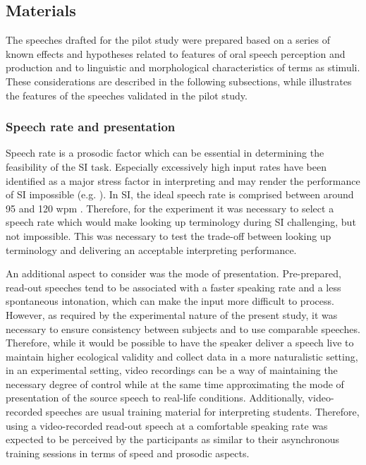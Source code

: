 \subsection{Materials} \label{material_PS}
The speeches drafted for the pilot study were prepared based on a series of known effects and hypotheses related to features of oral speech perception and production and to linguistic and morphological characteristics of terms as stimuli. These considerations are described in the following subsections, while  illustrates the features of the speeches validated in the pilot study.


\subsubsection{Speech rate and presentation} \label{speechrate}
Speech rate is a prosodic factor which can be essential in determining the feasibility of the SI task. Especially excessively high input rates have been identified as a major stress factor in interpreting and may render the performance of SI impossible (e.g. \citealt{riccardi2015speech}). In SI, the ideal speech rate is comprised between around 95 and 120 wpm \citep{seleskovitch_language_1978,gerver_empirical_1976,seleskovitch_language_1978,lederer_traduction_1981,pio_relation_2003,seeber_temporale_2005}. Therefore, for the experiment it was necessary to select a speech rate which would make looking up terminology during SI challenging, but not impossible. This was necessary to test the trade-off between looking up terminology and delivering an acceptable interpreting performance.

An additional aspect to consider was the mode of presentation. Pre-prepared, read-out speeches tend to be associated with a faster speaking rate and a less spontaneous intonation, which can make the input more difficult to process. However, as required by the experimental nature of the present study, it was necessary to ensure consistency between subjects and to use comparable speeches. Therefore, while it would be possible to have the speaker deliver a speech live to maintain higher ecological validity and collect data in a more naturalistic setting, in an experimental setting, video recordings can be a way of maintaining the necessary degree of control while at the same time approximating the mode of presentation of the source speech to real-life conditions. Additionally, video-recorded speeches are usual training material for interpreting students. Therefore, using a video-recorded read-out speech at a comfortable speaking rate was expected to be perceived by the participants as similar to their asynchronous training sessions in terms of speed and prosodic aspects.



